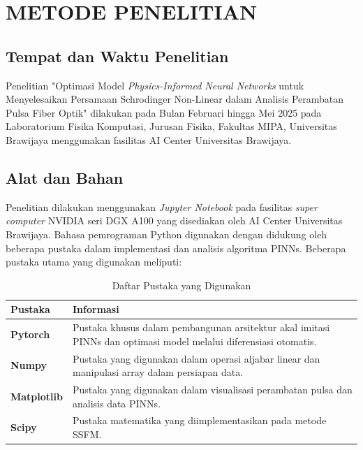 \chapter{METODE PENELITIAN}

\section{Tempat dan Waktu Penelitian}
Penelitian "Optimasi Model \emph{Physics-Informed Neural Networks} untuk Menyelesaikan Persamaan Schrodinger Non-Linear dalam Analisis Perambatan Pulsa Fiber Optik" dilakukan pada Bulan Februari hingga Mei 2025 pada Laboratorium Fisika Komputasi, Jurusan Fisika, Fakultas MIPA, Universitas Brawijaya menggunakan fasilitas AI Center Universitas Brawijaya.

\section{Alat dan Bahan}
Penelitian dilakukan menggunakan \emph{Jupyter Notebook} pada fasilitas \emph{super computer} NVIDIA seri DGX A100 yang disediakan oleh AI Center Universitas Brawijaya. Bahasa pemrograman Python digunakan dengan didukung oleh beberapa pustaka dalam implementasi dan analisis algoritma PINNs. Beberapa pustaka utama yang digunakan meliputi:

\begin{table}[htbp]
    \centering
    \begin{threeparttable}
        \caption{Daftar Pustaka yang Digunakan}
        \begin{tabular}{|p{2cm}|p{8cm}|}
				\hline
				Pustaka & Informasi \\
                \hline 
                \textbf{Pytorch} & Pustaka khusus dalam pembangunan arsitektur akal imitasi PINNs dan optimasi model melalui diferensiasi otomatis.\\
                \hline
                \textbf{Numpy} & Pustaka yang digunakan dalam operasi aljabar linear dan manipulasi array dalam persiapan data.\\
                \hline
                \textbf{Matplotlib} & Pustaka yang digunakan dalam visualisasi perambatan pulsa dan analisis data PINNs.\\
                \hline
                \textbf{Scipy} & Pustaka matematika yang diimplementasikan pada metode SSFM.\\
                \hline
			\end{tabular}
    \end{threeparttable}
\end{table} 

